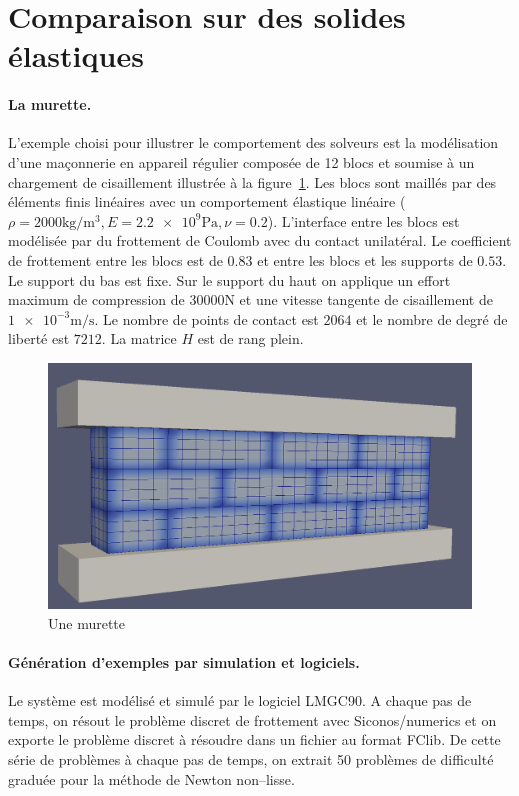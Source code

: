 \documentclass{CSMA2017}
\newcommand\ndm[1]{}
\begin{document}
\section{Comparaison sur des solides élastiques}

\paragraph{La murette.}
L'exemple choisi pour illustrer le comportement des solveurs est la modélisation d'une maçonnerie en appareil régulier composée de 12 blocs et soumise à un chargement de cisaillement illustrée à la figure~\ref{fig:LowWall_FEM}. Les blocs sont maillés par des éléments finis linéaires avec un comportement élastique linéaire ($\rho= \num{2000}\si{\kilogram\per\cubic\metre}, E=\num{2.2e+9}\si{\pascal} ,\nu = 0.2$). L'interface entre les blocs est modélisée par du frottement de Coulomb avec du contact unilatéral.  Le coefficient de frottement entre les blocs est de $0.83$ et entre les blocs et les supports de $0.53$. Le support du bas est fixe. Sur le support du haut on applique un effort  maximum de compression de $30000 \si{\newton}$ et une vitesse tangente de cisaillement de $\num{1e-3}\si{\meter\per\second}$.
\ndm{{verifier la description. nombre et type d'éléments}} Le nombre de points de contact est $2064$ et le nombre de degré de liberté est $7212$. La matrice $H$ est de rang plein.
\begin{figure}[htbp]
  \centering
  \includegraphics[height=0.2\textheight]{./figure/LowWall_FEM.png}
  \caption{Une murette}
  \label{fig:LowWall_FEM}
\end{figure}

\paragraph{Génération d'exemples par simulation et logiciels.}
Le système est modélisé et simulé par le logiciel LMGC90. A chaque pas de temps, on résout le problème discret de frottement avec Siconos/numerics et on exporte le problème discret à résoudre dans un fichier au format FClib. De cette série de problèmes  à
chaque pas de temps, on extrait  50 problèmes de difficulté graduée pour la méthode de Newton non--lisse.
\end{document}
